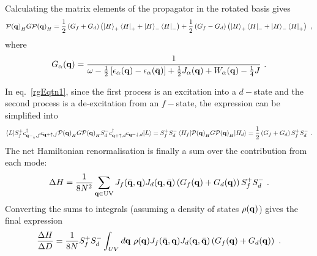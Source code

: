 \documentclass[%
reprint,
superscriptaddress,
groupedaddress,
superscriptaddress,
onecolumn,
10pt
]{revtex4-2}
\begin{document}
Calculating the matrix elements of the propagator in the rotated basis gives
\begin{equation}\begin{aligned}\label{PGP}
	\mathcal{P({\bf q})}_H G \mathcal{P({\bf q})}_H = \frac{1}{2}\left(G_f + G_d\right)\left(\ket{H}_+\bra{H}_+ + \ket{H}_-\bra{H}_-\right) + \frac{1}{2}\left(G_f - G_d\right)\left(\ket{H}_+\bra{H}_- + \ket{H}_-\bra{H}_+\right)~,
\end{aligned}\end{equation}
where
\begin{equation}\begin{aligned}
	G_\alpha({\bf q}) = \frac{1}{\omega - \frac{1}{2}\left[\epsilon_\alpha({\bf q}) - \epsilon_\alpha(\bar{\bf q})\right] + \frac{1}{2}J_\alpha({\bf q}) + W_\alpha({\bf q}) - \frac{1}{4}J}~.
\end{aligned}\end{equation}

In eq.~\ref{rgEqtn1}, since the first process is an excitation into a \(d-\)state and the second process is a de-excitation from an \(f-\)state, the expression can be simplified into
\begin{equation}\begin{aligned}\label{rgEqtn2}
	\braket{L | S_f^+ c^\dagger_{{\bf q-}_\downarrow,f}c_{{\bf q+}\uparrow,f} \mathcal{P({\bf q})}_H G \mathcal{P({\bf q})}_H S_d^- c^\dagger_{{\bf q+}\uparrow,d}c_{{\bf q-}\downarrow,d} | L } = S_f^+ S_d^- \braket{H_f | \mathcal{P({\bf q})}_H G \mathcal{P({\bf q})}_H | H_d} = \frac{1}{2}\left(G_f + G_d\right) S_f^+ S_d^-~.
\end{aligned}\end{equation}
The net Hamiltonian renormalisation is finally a sum over the contribution from each mode:
\begin{equation}\begin{aligned}
	\Delta H = \frac{1}{8N^2} \sum_{{\bf q} \in \text{UV}}J_f(\bar{\bf q},{\bf q}) J_d({\bf q},\bar{\bf q})\left(G_f({\bf q}) + G_d({\bf q})\right) S_f^+ S_d^-~.
\end{aligned}\end{equation}
Converting the sums to integrals (assuming a density of states \(\rho({\bf q})\)) gives the final expression
\begin{equation}\begin{aligned}
	\frac{\Delta H}{\Delta D} = \frac{1}{8N} S_f^+ S_d^-\int_{UV} d{\bf q} ~\rho({\bf q}) J_f(\bar{\bf q},{\bf q}) J_d({\bf q},\bar{\bf q})\left(G_f({\bf q}) + G_d({\bf q})\right)~.
\end{aligned}\end{equation}
\end{document}
